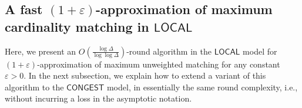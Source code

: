 \documentclass[11pt]{article}
\newcommand{\eps}{\varepsilon}
\begin{document}
%
%
%

\subsection{A fast $(1+\eps)$-approximation of maximum cardinality matching in $\mathsf{LOCAL}$}
\label{sec:1epsMM}
Here, we present an $O(\frac{\log \Delta}{\log\log \Delta})$-round algorithm in the $\mathsf{LOCAL}$ model for $(1+\eps)$-approximation of maximum unweighted matching for any constant $\eps>0$. In the next subsection, we explain how to extend a variant of this algorithm to the $\mathsf{CONGEST}$ model, in essentially the same round complexity, i.e., without incurring a loss in the asymptotic notation.
\end{document}
